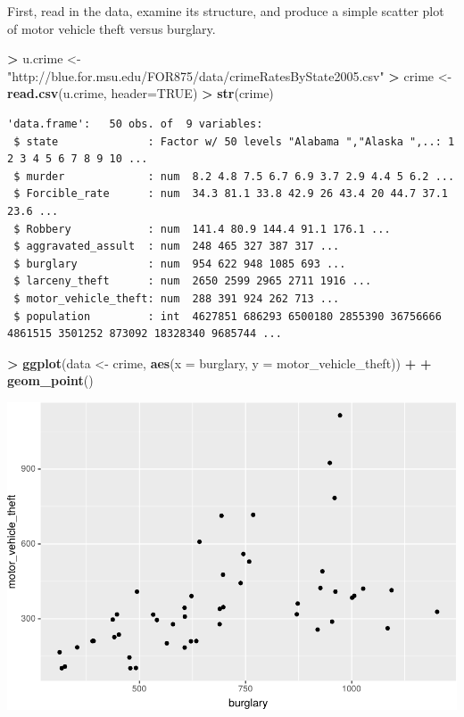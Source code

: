 \documentclass[]{krantz}
\makeatletter
\newenvironment{Shaded}{\begin{snugshade}}{\end{snugshade}}
\newcommand{\DataTypeTok}[1]{\textcolor[rgb]{0.27,0.27,0.27}{#1}}
\newcommand{\KeywordTok}[1]{\textcolor[rgb]{0.27,0.27,0.27}{\textbf{#1}}}
\newcommand{\NormalTok}[1]{#1}
\newcommand{\OperatorTok}[1]{\textcolor[rgb]{0.43,0.43,0.43}{\textbf{#1}}}
\newcommand{\OtherTok}[1]{\textcolor[rgb]{0.37,0.37,0.37}{#1}}
\newcommand{\StringTok}[1]{\textcolor[rgb]{0.5,0.5,0.5}{#1}}
\newenvironment{kframe}{%
\medskip{}
\setlength{\fboxsep}{.8em}
 \def\at@end@of@kframe{}%
 \ifinner\ifhmode%
  \def\at@end@of@kframe{\end{minipage}}%
  \begin{minipage}{\columnwidth}%
 \fi\fi%
 \def\FrameCommand##1{\hskip\@totalleftmargin \hskip-\fboxsep
 \colorbox{shadecolor}{##1}\hskip-\fboxsep
     \hskip-\linewidth \hskip-\@totalleftmargin \hskip\columnwidth}%
 \MakeFramed {\advance\hsize-\width
   \@totalleftmargin\z@ \linewidth\hsize
   \@setminipage}}%
 {\par\unskip\endMakeFramed%
 \at@end@of@kframe}
\renewenvironment{Shaded}{\begin{kframe}}{\end{kframe}}
\makeatother
\begin{document}
First, read in the data, examine its structure, and produce a simple scatter plot of motor vehicle theft versus burglary.

\begin{Shaded}
\begin{Highlighting}[]
\OperatorTok{>}\StringTok{ }\NormalTok{u.crime <-}\StringTok{ "http://blue.for.msu.edu/FOR875/data/crimeRatesByState2005.csv"}
\OperatorTok{>}\StringTok{ }\NormalTok{crime <-}\StringTok{ }\KeywordTok{read.csv}\NormalTok{(u.crime, }\DataTypeTok{header=}\OtherTok{TRUE}\NormalTok{)}
\OperatorTok{>}\StringTok{ }\KeywordTok{str}\NormalTok{(crime)}
\end{Highlighting}
\end{Shaded}

\begin{verbatim}
'data.frame':   50 obs. of  9 variables:
 $ state              : Factor w/ 50 levels "Alabama ","Alaska ",..: 1 2 3 4 5 6 7 8 9 10 ...
 $ murder             : num  8.2 4.8 7.5 6.7 6.9 3.7 2.9 4.4 5 6.2 ...
 $ Forcible_rate      : num  34.3 81.1 33.8 42.9 26 43.4 20 44.7 37.1 23.6 ...
 $ Robbery            : num  141.4 80.9 144.4 91.1 176.1 ...
 $ aggravated_assult  : num  248 465 327 387 317 ...
 $ burglary           : num  954 622 948 1085 693 ...
 $ larceny_theft      : num  2650 2599 2965 2711 1916 ...
 $ motor_vehicle_theft: num  288 391 924 262 713 ...
 $ population         : int  4627851 686293 6500180 2855390 36756666 4861515 3501252 873092 18328340 9685744 ...
\end{verbatim}

\begin{Shaded}
\begin{Highlighting}[]
\OperatorTok{>}\StringTok{ }\KeywordTok{ggplot}\NormalTok{(data <-}\StringTok{ }\NormalTok{crime, }\KeywordTok{aes}\NormalTok{(}\DataTypeTok{x =}\NormalTok{ burglary, }\DataTypeTok{y =}\NormalTok{ motor_vehicle_theft)) }\OperatorTok{+}\StringTok{ }
\OperatorTok{+}\StringTok{     }\KeywordTok{geom_point}\NormalTok{()}
\end{Highlighting}
\end{Shaded}

\includegraphics{bookdown_files/figure-latex/unnamed-chunk-67-1.pdf}
\end{document}
